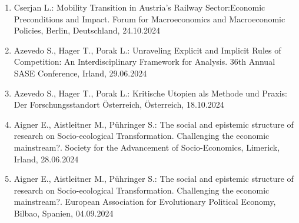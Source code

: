 \begin{enumerate}
	\item Cserjan L.: Mobility Transition in Austria’s Railway Sector:Economic Preconditions and Impact. Forum for Macroeconomics and Macroeconomic Policies, Berlin, Deutschland, 24.10.2024
	\item Azevedo S., Hager T., Porak L.: Unraveling Explicit and Implicit Rules of Competition: An Interdisciplinary Framework for Analysis. 36th Annual SASE Conference, Irland, 29.06.2024
	\item Azevedo S., Hager T., Porak L.: Kritische Utopien als Methode und Praxis: Der Forschungsstandort Österreich, Österreich, 18.10.2024
	\item Aigner E., Aistleitner M., Pühringer S.: The social and epistemic structure of research on Socio-ecological Transformation. Challenging the economic mainstream?. Society for the Advancement of Socio-Economics, Limerick, Irland, 28.06.2024
	\item Aigner E., Aistleitner M., Pühringer S.: The social and epistemic structure of research on Socio-ecological Transformation. Challenging the economic mainstream?. European Association for Evolutionary Political Economy, Bilbao, Spanien, 04.09.2024
\end{enumerate}
